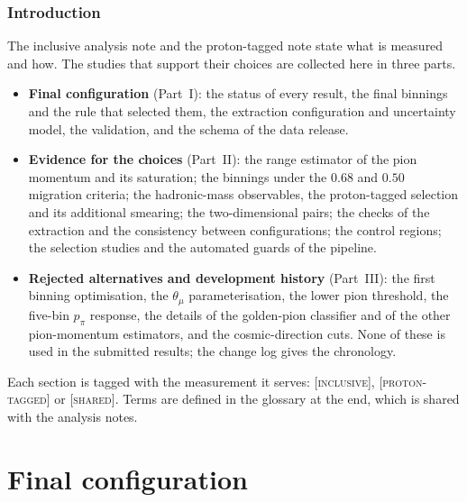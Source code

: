 \documentclass[11pt,a4paper]{article}
\newcommand{\scopetag}[1]{\hfill{\normalfont\small\textsc{[#1]}}}
\begin{document}
\section{Introduction}
\label{sec:supp_intro}

The inclusive analysis note and the proton-tagged note state what is measured and how. The studies
that support their choices are collected here in three parts.
\begin{itemize}\itemsep2pt
  \item \textbf{Final configuration} (Part~I): the status of every result, the final binnings and
    the rule that selected them, the extraction configuration and uncertainty model, the validation,
    and the schema of the data release.
  \item \textbf{Evidence for the choices} (Part~II): the range estimator of the pion momentum and
    its saturation; the binnings under the $0.68$ and $0.50$ migration criteria; the hadronic-mass
    observables, the proton-tagged selection and its additional smearing; the two-dimensional pairs;
    the checks of the extraction and the consistency between configurations; the control regions;
    the selection studies and the automated guards of the pipeline.
  \item \textbf{Rejected alternatives and development history} (Part~III): the first binning
    optimisation, the $\theta_\mu$ parameterisation, the lower pion threshold, the five-bin $p_\pi$
    response, the details of the golden-pion classifier and of the other pion-momentum estimators,
    and the cosmic-direction cuts. None of these is used in the submitted results; the change log
    gives the chronology.
\end{itemize}
Each section is tagged with the measurement it serves: \textsc{[inclusive]},
\textsc{[proton-tagged]} or \textsc{[shared]}. Terms are defined in the glossary at the end, which is
shared with the analysis notes.

\part{Final configuration}


\end{document}
